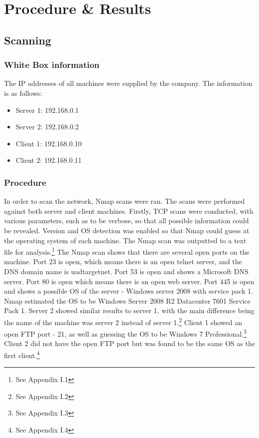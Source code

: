 \documentclass[12pt,a4paper]{article}
\begin{document}
	\clearpage

	\section{Procedure \& Results}
		\subsection{Scanning}
		\subsubsection{White Box information}
			The IP addresses of all machines were supplied by the company. The information is as follows:
			\begin{itemize}
				\item Server 1: 192.168.0.1
				\item Server 2: 192.168.0.2
				\item Client 1: 192.168.0.10
				\item Client 2: 192.168.0.11
			\end{itemize}
			\subsubsection{Procedure}
			In order to scan the network, Nmap scans were ran. The scans were performed against both server and client machines. Firstly, \acrshort{TCP} scans were conducted, with various parameters, such as to be verbose, so that all possible information could be revealed. Version and OS detection was enabled so that Nmap could guess at the operating system of each machine. The Nmap scan was outputted to a text file for analysis.\footnote{See Appendix I.1} The Nmap scan shows that there are several open ports on the machine. Port 23 is open, which means there is an open telnet server, and the \acrshort{DNS} domain name is uadtargetnet. Port 53 is open and shows a Microsoft \acrshort{DNS} server. Port 80 is open which means there is an open web server. Port 445 is open and shows a possible OS of the server - Windows server 2008 with service pack 1. Nmap estimated the OS to be Windows Server 2008 R2 Datacenter 7601 Service Pack 1. Server 2 showed similar results to server 1, with the main difference being the name of the machine was server 2 instead of server 1.\footnote{See Appendix I.2} Client 1 showed an open \acrshort{FTP} port - 21, as well as guessing the OS to be Windows 7 Professional.\footnote{See Appendix I.3} Client 2 did not have the open \acrshort{FTP} port but was found to be the same OS as the first client.\footnote{See Appendix I.4}
\end{document}
